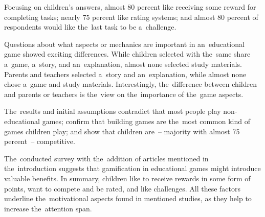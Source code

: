 Focusing on children's answers, almost 80 percent like receiving some reward for completing tasks; nearly 75 percent like rating systems; and almost 80 percent of respondents would like the~last task to be a~challenge.

Questions about what aspects or mechanics are important in an~educational game showed exciting differences.
While children selected with the~same share a~game, a~story, and an~explanation, almost none selected study materials.
Parents and teachers selected a~story and an~explanation, while almost none chose a~game and study materials.
Interestingly, the~difference between children and parents or teachers is the~view on the~importance of the~game aspects.

The~results and initial assumptions contradict that most people play non-educational games; confirm that building games are the~most common kind of games children play; and show that children are~-- majority with almost 75 percent~-- competitive. 

The~conducted survey with the~addition of articles mentioned in the~introduction suggests that gamification in educational games might introduce valuable benefits.
In summary, children like to receive rewards in some form of points, want to compete and be rated, and like challenges.
All these factors underline the~motivational aspects found in mentioned studies,
as they help to increase the~attention span.
